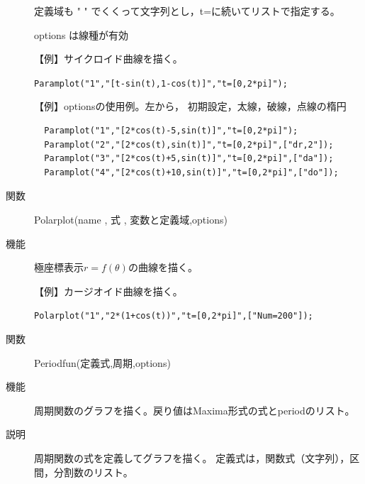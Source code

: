\documentclass[papersize,a4paper,12pt,uplatex]{jsarticle}
\begin{document}
\begin{description}
定義域も " " でくくって文字列とし，t=に続いてリストで指定する。

options は線種が有効

\vspace{\baselineskip}
【例】サイクロイド曲線を描く。

\hspace{10mm} \verb|Paramplot("1","[t-sin(t),1-cos(t)]","t=[0,2*pi]");|

\vspace{\baselineskip}
\hspace{20mm}  

\vspace{\baselineskip}
【例】optionsの使用例。左から， 初期設定，太線，破線，点線の楕円
\begin{verbatim}
  Paramplot("1","[2*cos(t)-5,sin(t)]","t=[0,2*pi]");
  Paramplot("2","[2*cos(t),sin(t)]","t=[0,2*pi]",["dr,2"]);
  Paramplot("3","[2*cos(t)+5,sin(t)]","t=[0,2*pi]",["da"]);
  Paramplot("4","[2*cos(t)+10,sin(t)]","t=[0,2*pi]",["do"]);
\end{verbatim}
\begin{center}  \end{center}


\vspace{\baselineskip}
\hypertarget{polarplot}{}
\item[関数]  Polarplot(name , 式 , 変数と定義域,options)
\item[機能]  極座標表示$r=f(\theta)$の曲線を描く。

\vspace{\baselineskip}
【例】カージオイド曲線を描く。

\hspace{20mm}\verb|Polarplot("1","2*(1+cos(t))","t=[0,2*pi]",["Num=200"]);|

\vspace{\baselineskip}
\begin{center}\scalebox{0.9}{}\end{center}

\vspace{\baselineskip}
\hypertarget{periodfun}{}
\item[関数]  Periodfun(定義式,周期,options)
\item[機能]  周期関数のグラフを描く。戻り値はMaxima形式の式とperiodのリスト。
\item[説明]  周期関数の式を定義してグラフを描く。
定義式は，関数式（文字列），区間，分割数のリスト。


\end{description}
\end{document}
